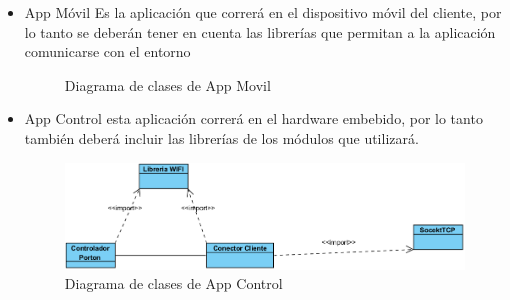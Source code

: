 \documentclass[16pt, article,notitlepage]{article}
\begin{document}
\begin{itemize}
	\item App Móvil Es la aplicación que correrá en el dispositivo móvil del cliente, por lo tanto se deberán tener en cuenta las librerías que permitan a la aplicación comunicarse con el entorno
	\begin{figure}[H]
		\caption{Diagrama de clases de App Movil}
	\end{figure}
	\item App Control esta aplicación correrá en el hardware embebido, por lo tanto también deberá incluir las librerías de los módulos que utilizará.
	\begin{figure}[H]
		\centering \includegraphics[width=0.8\linewidth]{./images/AppControl.png}
		\caption{Diagrama de clases de App Control}
	\end{figure}
\end{itemize}
\end{document}

